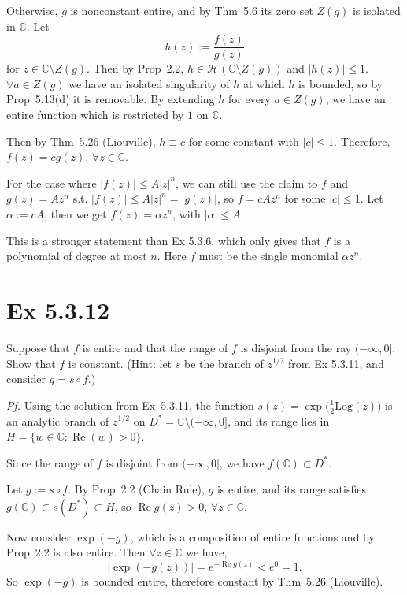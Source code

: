 \documentclass[a4paper]{article}
\newcommand{\C}{\mathbb{C}}
\newcommand{\Hol}{\mathcal{H}}
\renewcommand{\Re}{\operatorname{Re}}
\begin{document}
\medskip
Otherwise, $g$ is nonconstant entire, and by Thm~5.6 its zero set $Z(g)$ is isolated
in $\C$. Let
\[
h(z) := \frac{f(z)}{g(z)}
\]
for $z \in \C \setminus Z(g)$. Then by Prop~2.2, $h \in \Hol(\C \setminus Z(g))$ and $|h(z)| \leq 1$.
$\forall a \in Z(g)$ we have an isolated singularity of $h$ at which $h$ is bounded, so by
Prop~5.13(d) it is removable. By extending $h$ for every $a \in Z(g)$, we have an entire function which is restricted by $1$ on $\mathbb{C}$. 

\medskip
Then by Thm~5.26 (Liouville), $h \equiv c$ for some constant with $|c| \leq 1$. Therefore,
$f(z) = c g(z)$, $\forall z \in \C$.

\medskip
For the case where $|f(z)| \leq A|z|^n$, we can still use the claim to $f$ and $g(z) = A z^n$ s.t. $|f(z)| \leq A|z|^n = |g(z)|$, so $f = c A z^n$
for some $|c| \leq 1$. Let $\alpha := cA$, then we get $f(z) = \alpha z^n$, with $|\alpha| \leq A$.

\medskip
This is a stronger statement than Ex 5.3.6, which only gives that $f$ is a polynomial of
degree at most $n$. Here $f$ must be the single monomial $\alpha z^n$.

\newpage
\section*{Ex 5.3.12}

\begin{tcolorbox}[colback=gray!10, colframe=black, boxrule=0.5pt, arc=2mm]
Suppose that $f$ is entire and that the range of $f$ is disjoint from the ray
$(-\infty, 0]$. Show that $f$ is constant. (Hint: let $s$ be the branch of
$z^{1/2}$ from Ex 5.3.11, and consider $g = s \circ f$.)
\end{tcolorbox}

\textit{Pf.} Using the solution from Ex~5.3.11, the function $s(z) = \exp\big(\tfrac{1}{2} \mathrm{Log}(z)\big)$ is an
analytic branch of $z^{1/2}$ on $D^* = \C \setminus (-\infty, 0]$, and its range lies in $H = \{w \in \C : \Re(w) > 0\}$.

\medskip
Since the range of $f$ is disjoint from $(-\infty, 0]$, we have $f(\C) \subset D^*$.

Let $g := s \circ f$. By Prop~2.2 (Chain Rule), $g$ is entire, and its
range satisfies $g(\C) \subset s(D^*) \subset H$, so $\Re g(z) > 0$, $\forall z \in \C$.

\medskip
Now consider $\exp(-g)$, which is a composition of entire functions and by Prop~2.2 is also entire. Then $\forall z \in \C$ we have,
\[
|\exp(-g(z))| = e^{-\Re g(z)} < e^0 = 1.
\]
So $\exp(-g)$ is bounded entire, therefore constant by Thm~5.26 (Liouville).
\end{document}
